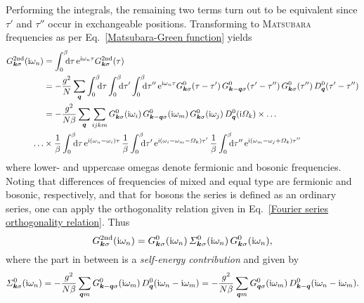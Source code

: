 Performing the integrals, the remaining two terms turn out to be equivalent
since $\tau'$ and $\tau''$ occur in exchangeable positions. Transforming to
\textsc{Matsubara} frequencies as per Eq.~\ref{Matsubara-Green function} yields
%
\begin{align*}
    G \super{2nd}_{\vec k \sigma}(\I \omega_n)
    &= \int \from 0 \till \beta \D \tau \,
    \E^{\I \omega_n \tau} G \super{2nd}_{\vec k \sigma}(\tau) \\
    &= -\frac {g^2} N \sum_{\vec q}
    \int \from 0 \till \beta \D \tau
    \int \from 0 \till \beta \D \tau'
    \int \from 0 \till \beta \D \tau'' \,
    \E^{\I \omega_n \tau}
    G^0_{\vec k \sigma}(\tau - \tau') \,
    G^0_{\vec k - \vec q \sigma}(\tau' - \tau'') \,
    G^0_{\vec k \sigma}(\tau'') \,
    D^0_{\vec q}(\tau' - \tau'') \\
    &= -\frac {g^2}{N \beta} \sum_{\vec q} \sum_{i j k m}
    G^0_{\vec k \sigma}(\I \omega_i) \,
    G^0_{\vec k - \vec q \sigma}(\I \omega_m) \,
    G^0_{\vec k \sigma}(\I \omega_j) \,
    D^0_{\vec q}(\I \Omega_k) \times \dots \\
    \dots &\times
    \frac 1 \beta \int \from 0 \till \beta \D \tau \,
    \E^{\I (\omega_n - \omega_i) \tau} \,
    \frac 1 \beta \int \from 0 \till \beta \D \tau' \,
    \E^{\I (\omega_i - \omega_m - \Omega_k) \tau'} \,
    \frac 1 \beta \int \from 0 \till \beta \D \tau'' \,
    \E^{\I (\omega_m - \omega_j + \Omega_k) \tau''}
\end{align*}
%
where lower- and uppercase omegas denote fermionic and bosonic 
frequencies. Noting that differences of  frequencies of mixed
and equal type are fermionic and bosonic, respectively, and that for bosons the
 series is defined as an ordinary  series,
one can apply the orthogonality relation given in Eq.~\ref{Fourier series
orthogonality relation}. Thus
%
\begin{equation*}
    G \sp{\text{2nd}}_{\boldsymbol k \sigma}(\mathrm i \omega_n) =
    G^0_{\boldsymbol k \sigma}(\mathrm i \omega_n) \,
    \varSigma^0_{\boldsymbol k \sigma}(\mathrm i \omega_n) \,
    G^0_{\boldsymbol k \sigma}(\mathrm i \omega_n),
\end{equation*}
%
where the part in between is a \emph{self-energy contribution} and given by
%
\begin{equation} \label{self-energy contribution}
    \varSigma^0_{\boldsymbol k \sigma}(\mathrm i \omega_n)
    = -\frac {g^2}{N \beta} \sum_{\boldsymbol q m}
    G^0_{\boldsymbol k - \boldsymbol q \sigma}(\mathrm i \omega_m) \,
    D^0_{\boldsymbol q}(\mathrm i \omega_n - \mathrm i \omega_m)
    = -\frac {g^2}{N \beta} \sum_{\boldsymbol q m}
    G^0_{\boldsymbol q \sigma}(\mathrm i \omega_m) \,
    D^0_{\boldsymbol k - \boldsymbol q}(\mathrm i \omega_n - \mathrm i \omega_m).
\end{equation}

